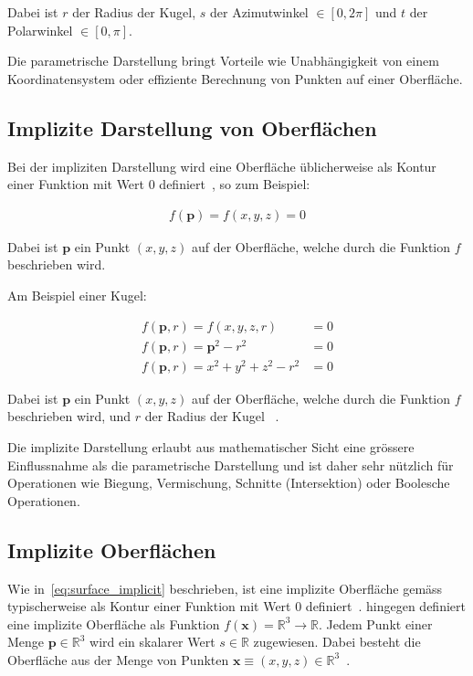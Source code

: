 Dabei ist $r$ der Radius der Kugel, $s$ der Azimutwinkel $\in [0, 2\pi]$ und
$t$ der Polarwinkel $\in [0, \pi]$.

Die parametrische Darstellung bringt Vorteile wie Unabhängigkeit von
einem Koordinatensystem oder effiziente Berechnung von Punkten auf
einer Oberfläche.

\subsection{Implizite Darstellung von Oberflächen}
\label{subsec:surfaces:display:implicit}

Bei der impliziten Darstellung wird eine Oberfläche üblicherweise als Kontur
einer Funktion mit Wert 0 definiert~\parencite[S.
1]{menon_introduction_1996}, so zum Beispiel:

\begin{gather}\label{eq:surface_implicit}
    f(\bm{p}) = f(x, y, z) = 0
\end{gather}

Dabei ist $\bm{p}$ ein Punkt $(x, y, z)$ auf der Oberfläche, welche durch die Funktion
$f$ beschrieben wird.

Am Beispiel einer Kugel:

\begin{align}\label{eq:sphere_implicit}
    f(\bm{p}, r) = f(x, y, z, r) &= 0 \\
    f(\bm{p}, r) = \bm{p}^{2} - r^{2} &= 0 \\
    f(\bm{p}, r) = x^{2} + y^{2} + z^{2} - r^{2} &= 0
\end{align}

Dabei ist $\bm{p}$ ein Punkt $(x, y, z)$ auf der Oberfläche, welche durch
die Funktion $f$ beschrieben wird, und $r$ der Radius der Kugel
~\parencite[S. 91]{glassner_introduction_1989}.

Die implizite Darstellung erlaubt aus mathematischer Sicht eine grössere
Einflussnahme als die parametrische Darstellung und ist daher sehr
nützlich für Operationen wie Biegung, Vermischung, Schnitte
(Intersektion) oder Boolesche Operationen.

\subsection{Implizite Oberflächen}
\label{subsec:implicit_surfaces}

Wie in~\autoref{eq:surface_implicit} beschrieben, ist eine implizite
Oberfläche gemäss~\citeauthor{menon_introduction_1996} typischerweise als
Kontur einer Funktion mit Wert 0
definiert~\parencite[S. 1]{menon_introduction_1996}.
\citeauthor{hart_ray_1993} hingegen definiert eine implizite Oberfläche
als Funktion $ f(\bm{x}) = \mathbb{R}^{3} \to \mathbb{R} $. Jedem
Punkt einer Menge $ \bm{p} \in \mathbb{R}^{3} $ wird ein skalarer
Wert $ s \in \mathbb{R} $ zugewiesen. Dabei besteht die Oberfläche aus
der Menge von Punkten $ \bm{x} \equiv (x, y, z) \in \mathbb{R}^{3}
$~\parencite[S. 527]{hart_sphere_1994}.

